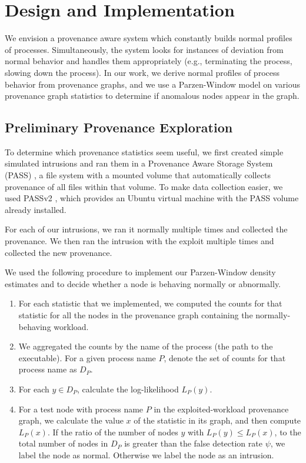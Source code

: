 \documentclass[10pt,twocolumn]{article}
\begin{document}
%

\section{Design and Implementation}

We envision a provenance aware system which constantly builds normal profiles of processes. Simultaneously,
the system looks for instances of deviation from normal behavior and handles them appropriately
(e.g., terminating the process, slowing down the process). In our work, we derive normal profiles of process behavior
from provenance graphs, and we use a Parzen-Window model on various provenance graph statistics
to determine if anomalous nodes appear in the graph.

\subsection{Preliminary Provenance Exploration}

To determine which provenance statistics seem useful, we first created simple simulated intrusions
and ran them in a Provenance Aware Storage System (PASS) \cite{pass}, a file system with
a mounted volume that automatically collects provenance of all files within that volume.
To make data collection easier, we used PASSv2 \cite{passv2}, which provides an Ubuntu virtual machine with the PASS volume already installed.

For each of our intrusions, we ran it normally multiple times and collected the provenance. We then ran the
intrusion with the exploit multiple times and collected the new provenance.

We used the following procedure to implement our Parzen-Window density estimates and to decide whether a node is behaving normally or abnormally.
\begin{enumerate}
\item For each statistic that we implemented, we computed the counts for that statistic for all the
nodes in the provenance graph containing the normally-behaving workload.
\item We aggregated the counts by the name of the process (the path to the executable). For a given process name $P$, denote the
set of counts for that process name as $D_P$.
\item For each $y \in D_P$, calculate the log-likelihood $L_P(y)$.
\item For a test node with process name $P$ in the exploited-workload provenance graph, we calculate the value $x$ of the statistic in its graph, and then compute $L_P(x)$. 
If the ratio of the number of nodes $y$ with $L_P(y) \leq L_P(x)$,
to the total number of nodes in $D_P$ is greater than the false detection rate $\psi$, we label the node as normal. Otherwise we label the node as
an intrusion.
\end{enumerate}
\end{document}
